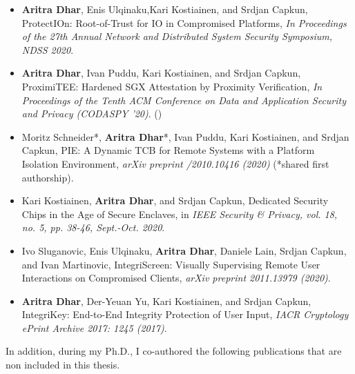 \begin{itemize}
  
  \item \textbf{Aritra Dhar}, Enis Ulqinaku,Kari Kostiainen, and Srdjan Capkun, ProtectIOn: Root-of-Trust for IO in Compromised Platforms, \emph{In Proceedings of the 27th Annual Network and Distributed System Security Symposium, NDSS 2020}. 
  
  \item \textbf{Aritra Dhar}, Ivan Puddu, Kari Kostiainen, and Srdjan Capkun, ProximiTEE: Hardened SGX Attestation by Proximity Verification, \emph{In Proceedings of the Tenth ACM Conference on Data and Application Security and Privacy (CODASPY '20)}. (\faTrophy)
  
  \item Moritz Schneider*, \textbf{Aritra Dhar}*, Ivan Puddu, Kari Kostiainen, and Srdjan Capkun, PIE: A Dynamic TCB for Remote Systems with a Platform Isolation Environment, \emph{arXiv preprint /2010.10416 (2020)} (*shared first authorship).
  
  \item Kari Kostiainen, \textbf{Aritra Dhar}, and Srdjan Capkun, Dedicated Security Chips in the Age of Secure Enclaves, in \emph{IEEE Security \& Privacy, vol. 18, no. 5, pp. 38-46, Sept.-Oct. 2020}.
  
  \item Ivo Sluganovic, Enis Ulqinaku, \textbf{Aritra Dhar}, Daniele Lain, Srdjan Capkun, and Ivan Martinovic, IntegriScreen: Visually Supervising Remote User Interactions on Compromised Clients, \emph{arXiv preprint 2011.13979 (2020)}.
   
  \item \textbf{Aritra Dhar}, Der-Yeuan Yu, Kari Kostiainen, and Srdjan Capkun, IntegriKey: End-to-End Integrity Protection of User Input, \emph{IACR Cryptology ePrint Archive 2017: 1245 (2017)}.
 
\end{itemize}

 In addition, during my Ph.D., I co-authored the following publications that are non included in this thesis.
 
